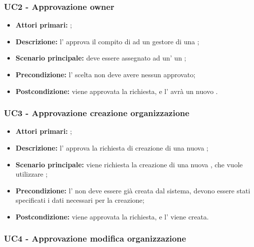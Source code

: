 \documentclass[casi-duso]{subfiles}
\begin{document}

\subsubsection{UC2 - Approvazione owner}
\label{subsub:UC2}

\begin{itemize}
  \item \textbf{Attori primari:} ;
  \item \textbf{Descrizione:} l' approva il compito di  ad un gestore di una ;
  \item \textbf{Scenario principale:} deve essere assegnato ad un' un ;
  \item \textbf{Precondizione:} l' scelta non deve avere nessun  approvato;
  \item \textbf{Postcondizione:} viene approvata la richiesta, e l' avrà un nuovo .

\end{itemize}
\subsubsection{UC3 - Approvazione creazione organizzazione}
\label{subsub:UC3}

\begin{itemize}
  \item \textbf{Attori primari:} ;
  \item \textbf{Descrizione:} l' approva la richiesta di creazione di una nuova ;
  \item \textbf{Scenario principale:} viene richiesta la creazione di una nuova , che vuole utilizzare ;
  \item \textbf{Precondizione:} l' non deve essere già creata dal sistema, devono essere stati specificati i dati necessari per la creazione;
  \item \textbf{Postcondizione:} viene approvata la richiesta, e l' viene creata.

\end{itemize}
\subsubsection{UC4 - Approvazione modifica organizzazione}
\label{subsub:UC4}
\end{document}
